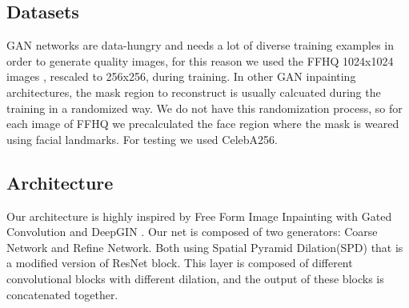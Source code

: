 \documentclass[10pt,twocolumn,letterpaper]{article}
\begin{document}
	\subsection{Datasets}
  GAN networks are data-hungry and needs a lot of diverse training examples in
  order to generate quality images, for this reason we used the FFHQ 1024x1024
  images \cite{karras2019style}, rescaled to 256x256, during training.  In other
  GAN inpainting architectures, the mask region to reconstruct is usually
  calcuated during the training in a randomized way.  We do not have this
  randomization process, so for each image of FFHQ we precalculated the face
  region where the mask is weared using facial landmarks.  For testing we used
  CelebA256.

	\subsection{Architecture}
  Our architecture is highly inspired by Free Form Image Inpainting with Gated
  Convolution \cite{yu2019free} and DeepGIN \cite{li2020deepgin}.
  Our net is composed of two generators: Coarse Network and Refine Network.
  Both using Spatial Pyramid Dilation(SPD) that is a modified version of ResNet
  block. This layer is composed of different convolutional blocks with different
  dilation, and the output of these blocks is concatenated together.
	\begin{figure}[t]
		\label{fig:long}
		\label{fig:onecol}
	\end{figure}
\end{document}
